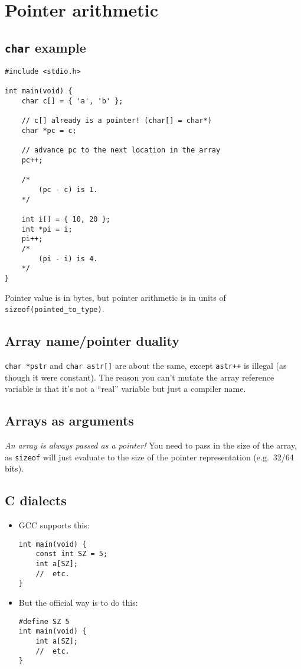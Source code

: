 \section{Pointer arithmetic}
\subsection{\texttt{char} example}
\begin{verbatim}
#include <stdio.h>

int main(void) {
	char c[] = { 'a', 'b' };
	
	// c[] already is a pointer! (char[] = char*)
	char *pc = c;
	
	// advance pc to the next location in the array
	pc++;
	
	/*
		(pc - c) is 1.
	*/
	
	int i[] = { 10, 20 };
	int *pi = i;
	pi++;
	/*
		(pi - i) is 4.
	*/
}
\end{verbatim}
Pointer value is in bytes, but pointer arithmetic is in units of \texttt{sizeof(pointed\_to\_type)}.

\subsection{Array name/pointer duality}
\texttt{char *pstr} and \texttt{char astr[]} are about the same, except \texttt{astr++} is illegal (as though it were constant).
The reason you can't mutate the array reference variable is that it's not a ``real'' variable but just a compiler name.

\subsection{Arrays as arguments}
\emph{An array is always passed as a pointer!} You need to pass in the size of the array, as \texttt{sizeof} will just evaluate to the size of the pointer representation (e.g.~32/64 bits).


\subsection{C dialects}
\begin{itemize}
	\item GCC supports this:
\begin{verbatim}
int main(void) {
	const int SZ = 5;
	int a[SZ];
	//  etc.
}
\end{verbatim}
	\item But the official way is to do this:
\begin{verbatim}
#define SZ 5
int main(void) {
	int a[SZ];
	//  etc.
}
\end{verbatim}
\end{itemize}

